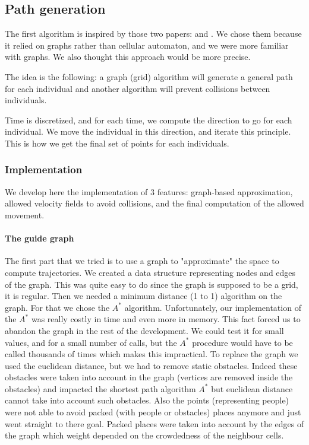 \subsection{Path generation}

The first algorithm is inspired by those two papers: \cite{PLE} and
\cite{vandenBerg2011}. We chose them because it relied on graphs
rather than cellular automaton, and we were more familiar with
graphs. We also thought this approach would be more precise.


The idea is the following: a graph (grid) algorithm will generate a
general path for each individual and another algorithm will prevent
collisions between individuals.


Time is discretized, and for each time, we compute the direction to go
for each individual. We move the individual in this direction, and
iterate this principle. This is how we get the final set of points for
each individuals.


\subsubsection{Implementation}

We develop here the implementation of 3 features: graph-based approximation, allowed velocity fields to avoid collisions, and the final computation of the allowed movement.

\paragraph{The guide graph}

The first part that we tried is to use a graph to "approximate" the space to compute trajectories. We created a data structure representing nodes and edges of the
graph. This was quite easy to do since the graph is
supposed to be a grid, it is regular.  Then we needed a minimum
distance (1 to 1) algorithm on the graph. For that we chose the $A^*$
algorithm. Unfortunately, our implementation of the $A^*$ was really
costly in time and even more in memory. This fact forced us to abandon
the graph in the rest of the development. We could test it for small
values, and for a small number of calls, but the $A^*$ procedure would
have to be called thousands of times which makes this impractical.  To
replace the graph we used the euclidean distance, but we had to remove
static obstacles. Indeed these obstacles were taken into account in
the graph (vertices are removed inside the obstacles) and impacted the shortest
path algorithm $A^*$ but euclidean distance cannot take into account
such obstacles.  Also the points (representing people) were not able
to avoid packed (with people or obstacles) places anymore and just
went straight to there goal. Packed places were taken into account by
the edges of the graph which weight depended on the crowdedness of the
neighbour cells.

